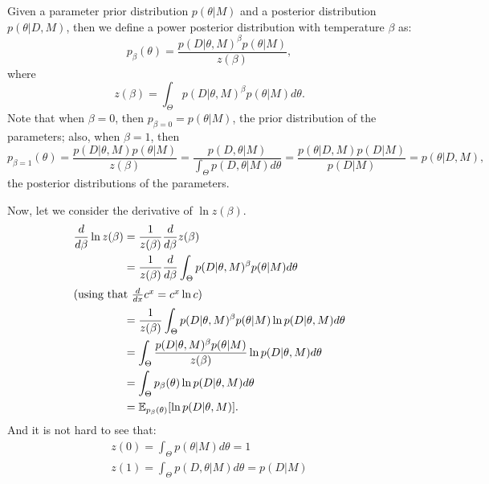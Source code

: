 Given a parameter prior distribution $p (\theta | M)$ and a posterior 
distribution $p (\theta | D, M)$, then we define a power posterior 
distribution with temperature $\beta$ as:
\begin{equation*}
    p_{\beta} (\theta) = \frac{p (D | \theta, M)^\beta p(\theta | M)}
                              {z (\beta)},
\end{equation*}
where
\begin{equation*}
    z (\beta) = \int_\Theta p (D | \theta, M)^\beta p(\theta | M) 
            d\theta.
\end{equation*}
Note that when $\beta = 0$, then $p_{\beta=0} = p (\theta | M)$, the 
prior distribution of the parameters; also, when $\beta = 1$, then
\begin{equation*}
    p_{\beta=1}(\theta) = \frac{p (D | \theta, M) p(\theta | M)}
                         {z (\beta)}
                        =\frac{p (D, \theta|M)}
                              {\int_\Theta p (D, \theta | M)d\theta}
                        =\frac{p(\theta | D, M) p(D|M)}{p (D | M)}
                        =p (\theta | D, M),
\end{equation*}
the posterior distributions of the parameters.

Now, let we consider the derivative of $\ln z(\beta)$.
\begin{align}
    \frac{d}{d\beta} \ln z(\beta) &= \frac{1}{z(\beta)}  
        \frac{d}{d\beta} z(\beta) \notag\\
    &= \frac{1}{z(\beta)} \frac{d}{d\beta} 
        \int_\Theta p (D | \theta, M)^\beta p(\theta | M) d\theta \notag\\
    \shortintertext{(using that $\frac{d}{dx} c^x = c^x \ln c$)}
    &= \frac{1}{z(\beta)} \int_\Theta p (D | \theta, M)^\beta 
        p(\theta | M) \ln p(D|\theta, M)d\theta \notag\\
    &= \int_\Theta \frac{p (D | \theta, M)^\beta p(\theta | M)}
                        {z(\beta)}
                    \ln p(D| \theta, M)d\theta \notag\\
    &=\int_\Theta p_\beta (\theta) \ln p (D | \theta, M)d\theta \notag\\ 
    &=\mathbb{E}_{p_\beta (\theta)} [\ln p(D|\theta, M)]. \label{eq:z_derivative}
\end{align}
And it is not hard to see that:
\begin{equation}
\begin{gathered}
    z (0) = \int_\Theta p (\theta | M)d\theta = 1 \\
    z (1) = \int_\Theta p (D, \theta | M)d\theta = p (D|M) 
    \label{eq:z_on_limits}
\end{gathered}
\end{equation}


